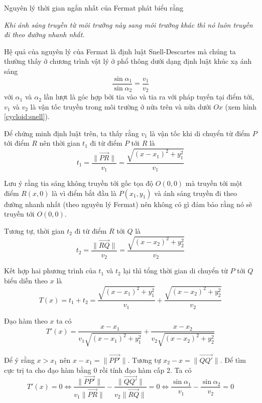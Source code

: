 \documentclass{mynotes}
\begin{document}
Nguyên lý thời gian ngắn nhất của Fermat phát biểu rằng

\textit{Khi ánh sáng truyền từ môi trường này sang môi trường khác thì nó luôn truyền đi theo đường nhanh nhất.}

Hệ quả của nguyên lý của Fermat là định luật Snell-Descartes mà chúng ta thường thấy ở chương trình vật lý ở phổ thông dưới dạng định luật khúc xạ ánh sáng
\begin{equation}
    \frac{\sin \alpha_1}{\sin \alpha_2} = \frac{v_1}{v_2}
\end{equation}
với $\alpha_1$ và $\alpha_2$ lần lượt là góc hợp bởi tia vào và tia ra với pháp tuyến tại điểm tới, $v_1$ và $v_2$ là vận tốc truyền trong môi trường ở nửa trên và nửa dưới $Ox$ (xem hình \ref{cycloid:snell}).

Để chứng minh định luật trên, ta thấy rằng $v_1$ là vận tốc khi di chuyển từ điểm $P$ tới điểm $R$ nên thời gian $t_1$ đi từ điểm $P$ tới $R$ là
\begin{equation}
    t_1 = \frac{\lVert \overrightarrow{PR} \rVert}{v_1} = \frac{\sqrt{(x - x_1)^2 + y_1^2}}{v_1}
\end{equation}

Lưu ý rằng tia sáng không truyền tới gốc tọa độ $O(0,0)$ mà truyền tới một điểm $R(x,0)$ là vì điểm bắt đầu là $P(x_1, y_1)$ và ánh sáng truyền đi theo đường nhanh nhất (theo nguyên lý Fermat) nên không có gì đảm bảo rằng nó sẽ truyền tới $O(0, 0)$.

Tương tự, thời gian $t_2$ đi từ điểm $R$ tới $Q$ là
\begin{equation}
    t_2 = \frac{\lVert \overrightarrow{RQ} \rVert}{v_2} = \frac{\sqrt{(x - x_2)^2 + y_2^2}}{v_2}
\end{equation}

Kết hợp hai phương trình của $t_1$ và $t_2$ lại thì tổng thời gian di chuyển từ $P$ tới $Q$ biểu diễn theo $x$ là
\begin{equation}
    T(x) = t_1 + t_2 = \frac{\sqrt{(x - x_1)^2 + y_1^2}}{v_1} + \frac{\sqrt{(x - x_2)^2 + y_2^2}}{v_2}
\end{equation}

Đạo hàm theo $x$ ta có
\begin{equation}
    T'(x) = \frac{x - x_1}{v_1 \sqrt{(x - x_1)^2 + y_1^2}} + \frac{x - x_2}{v_2 \sqrt{(x - x_2)^2 + y_2^2}}
\end{equation}

Để ý rằng $x > x_1$ nên $x - x_1 = \lVert \overrightarrow{PP'} \rVert$. Tương tự $x_2 - x = \lVert \overrightarrow{QQ'} \rVert$. Để tìm cực trị ta cho đạo hàm bằng 0 rồi tính đạo hàm cấp 2. Ta có
\begin{equation*}
    T'(x) = 0 \Leftrightarrow \frac{\lVert \overrightarrow{PP'} \rVert}{v_1 \lVert \overrightarrow{PR} \rVert} - \frac{\lVert \overrightarrow{QQ'} \rVert}{v_2 \lVert \overrightarrow{RQ} \rVert} = 0 \Leftrightarrow \frac{\sin \alpha_1}{v_1} - \frac{\sin \alpha_2}{v_2} = 0
\end{equation*}
\end{document}
